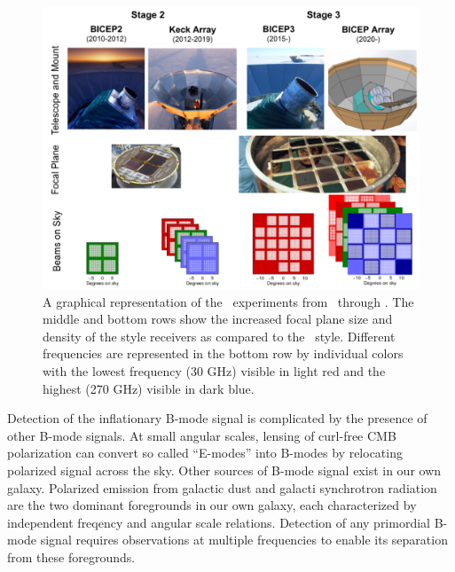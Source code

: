 \documentclass[]{spie}  %
\begin{document}
\begin{figure}[h]
	\center
	\includegraphics[scale=0.5]{progression.pdf}
	\caption{A graphical representation of the \bk\ experiments from
	\ through \biceparray. The middle and bottom rows show the increased focal plane size and density of the  style receivers as compared to the \ style. Different
	frequencies are represented in the bottom row by individual colors with the lowest frequency
	(30 GHz) visible in light red and the highest (270 GHz) visible in dark
	blue.}
	\label{fig:progression}
\end{figure}

Detection of the inflationary B-mode signal is complicated by the presence of
other B-mode signals. At small angular scales, lensing of curl-free CMB
polarization can convert so called ``E-modes'' into B-modes by relocating
polarized signal across the sky. Other sources of B-mode signal exist in our
own galaxy. Polarized emission from galactic dust and galacti synchrotron
radiation are the two dominant foregrounds in our own galaxy, each
characterized by independent freqency and angular scale relations. Detection
of any primordial B-mode signal requires observations at multiple frequencies
to enable its separation from these foregrounds. 
\end{document}
